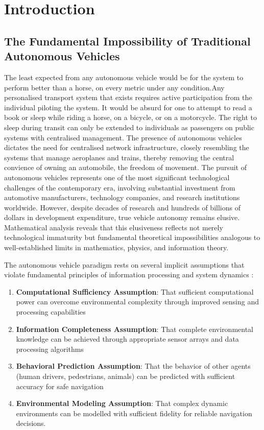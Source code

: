 \documentclass[12pt,a4paper]{article}
\begin{document}
\section{Introduction}

\subsection{The Fundamental Impossibility of Traditional Autonomous Vehicles}
The least expected from any autonomous vehicle would be for the system to perform better than a horse, on every metric under any condition.Any personalised transport system that exists requires active participation from the individual piloting the system. It would be absurd for one to attempt to read a book or sleep while riding a horse, on a bicycle, or on a motorcycle. The right to sleep during transit can only be extended to individuals as passengers on public systems with centralised management. The presence of autonomous vehicles dictates the need for centralised network infrastructure, closely resembling the systems that manage aeroplanes and trains, thereby removing the central convience of owning an automobile, the freedom of movement. The pursuit of autonomous vehicles represents one of the most significant technological challenges of the contemporary era, involving substantial investment from automotive manufacturers, technology companies, and research institutions worldwide. However, despite decades of research and hundreds of billions of dollars in development expenditure, true vehicle autonomy remains elusive. Mathematical analysis reveals that this elusiveness reflects not merely technological immaturity but fundamental theoretical impossibilities analogous to well-established limits in mathematics, physics, and information theory.

The autonomous vehicle paradigm rests on several implicit assumptions that violate fundamental principles of information processing and system dynamics \cite{shannon1948,cover1991,li1997}:

\begin{enumerate}
\item \textbf{Computational Sufficiency Assumption}: That sufficient computational power can overcome environmental complexity through improved sensing and processing capabilities
\item \textbf{Information Completeness Assumption}: That complete environmental knowledge can be achieved through appropriate sensor arrays and data processing algorithms  
\item \textbf{Behavioral Prediction Assumption}: That the behavior of other agents (human drivers, pedestrians, animals) can be predicted with sufficient accuracy for safe navigation
\item \textbf{Environmental Modeling Assumption}: That complex dynamic environments can be modelled with sufficient fidelity for reliable navigation decisions.
\end{enumerate}
\end{document}
